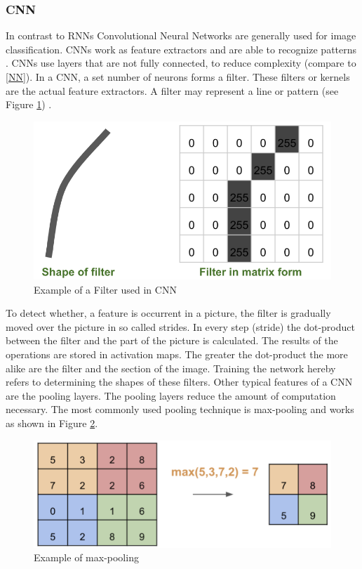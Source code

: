\subsubsection{CNN}
In contrast to RNNs Convolutional Neural Networks are generally used for image classification. CNNs work as feature extractors and are able to recognize patterns . CNNs use layers that are not fully connected, to reduce complexity (compare to \ref{NN}). In a CNN, a set number of neurons forms a filter. These filters or kernels are the actual feature extractors. A filter may represent a line or pattern (see Figure \ref{fig:filter}) \parencite{LeCun1998}.

\begin{figure}[h]
	\centering
	\includegraphics[scale=0.7]{Figures/filter}
	\decoRule
	\caption[Example of a Filter used in CNN]{Example of a Filter used in CNN \parencite{RichStureborg2019}}
	\label{fig:filter}
\end{figure}

To detect whether, a feature is occurrent in a picture, the filter is gradually moved over the picture in so called strides. In every step (stride) the dot-product between the filter and the part of the picture is calculated. The results of the operations are stored in activation maps.  The greater the dot-product the more alike are the filter and the section of the image. Training the network hereby refers to determining the shapes of these filters.
Other typical features of a CNN are the pooling layers. The pooling layers reduce the amount of computation necessary. The most commonly used pooling technique is max-pooling and works as shown in Figure \ref{fig:pooling}.

\begin{figure}[h]
	\centering
	\includegraphics[scale=0.2]{Figures/pooling}
	\decoRule
	\caption[Example of max-pooling]{Example of max-pooling \parencite{RichStureborg2019}}
	\label{fig:pooling}
\end{figure}

